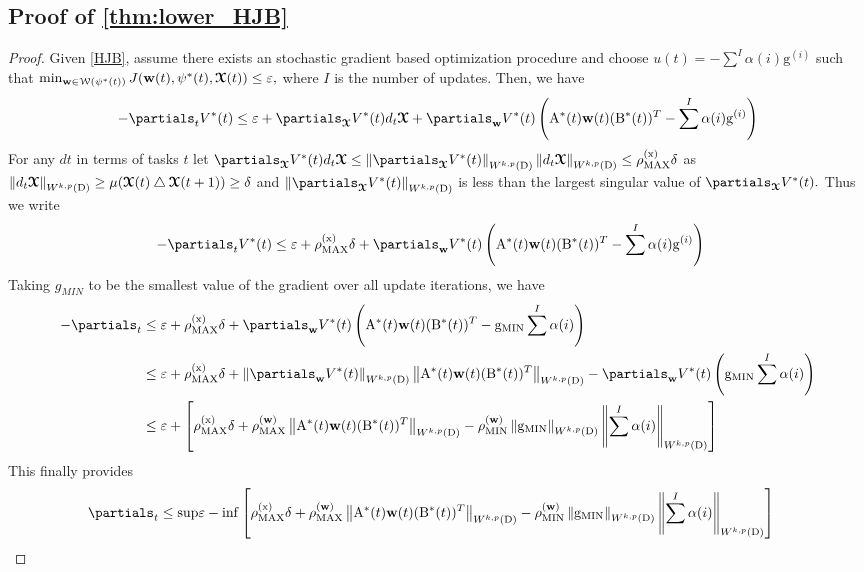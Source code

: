 \subsection{Proof of \cref{thm:lower_HJB}}\label{sec:lower_HJB}
\begin{proof}
Given \cref{HJB}, assume there exists an stochastic gradient based optimization procedure  and choose $ u(t) =- \sum^{I} \alpha(i) \mathrm{g}^{(i)}$  such that $\min_{\boldsymbol{\mathrm{w}} \in \mathcal{W}(\psi^*(t))} J(\boldsymbol{\mathrm{w}}(t),\psi^*(t),\boldsymbol{\mathcal{X}}(t)) \leq \varepsilon,$ where $I$ is the number of updates. Then, we have 
\begin{align*}
    -\partials_{t}V^*(t) & \leq \varepsilon + \partials_{\tx}V^*(t) d_{t} \tx +  \partials_{\weight}V^*(t)  \left( \mathrm{A}^*(t)\weight(t)( \mathrm{B}^*(t))^T - \sum^{I} \alpha(i) \mathrm{g}^{(i)}  \right)  \\    
\end{align*}
For any $dt$ in terms of tasks $t$  let $\partials_{\tx}V^*(t) d_{t} \tx \leq \norm{\partials_{\tx}V^*(t) } \norm{d_{t} \tx} \leq \sing \delta$ as $\left \|d_{t} \boldsymbol{\mathcal{X}} \right\|_{W^{k,p}(\mathrm{D})}  \geq \mu(\boldsymbol{\mathcal{X}}(t)\bigtriangleup \boldsymbol{\mathcal{X}}(t+1)) \geq \delta$ and $\norm{\partials_{\tx}V^*(t) }$ is less than the largest singular value of $\partials_{\tx}V^*(t) .$  Thus we write 
\begin{align*}
    -\partials_{t}V^*(t) & \leq \varepsilon + \sing \delta +  \partials_{\weight}V^*(t)  \left( \mathrm{A}^*(t)\weight(t)( \mathrm{B}^*(t))^T - \sum^{I} \alpha(i) \mathrm{g}^{(i)}  \right) 
\end{align*}
Taking $g_{MIN}$ to be the smallest value of the gradient over all update iterations, we have 
\begin{align*}
    -\partials_{t} & \leq \varepsilon + \sing \delta +  \partials_{\weight}V^*(t)  \left( \mathrm{A}^*(t)\weight(t) (\mathrm{B}^*(t))^T - \mathrm{g}_{\mathrm{MIN} } \sum^{I} \alpha(i)  \right) \\
     & \leq \varepsilon + \sing \delta +  \norm{\partials_{\weight}V^*(t) } \norm{\mathrm{A}^*(t)\weight(t)( \mathrm{B}^*(t))^T} - \partials_{\weight}V^*(t)  \left(  \mathrm{g}_{\mathrm{MIN} } \sum^{I} \alpha(i)  \right) \\
     & \leq \varepsilon + \left[\sing \delta +  \singw \norm{\mathrm{A}^*(t)\weight(t)( \mathrm{B}^*(t))^T} - \singmin \norm{\mathrm{g}_{\mathrm{MIN} }} \norm{\sum^{I} \alpha(i) } \right]
\end{align*}
This finally provides 
\begin{align*}
    \partials_{t} & \leq \mathrm{sup} \varepsilon - \mathrm{inf} \left[\sing \delta +  \singw \norm{\mathrm{A}^*(t)\weight(t)( \mathrm{B}^*(t))^T} - \singmin \norm{\mathrm{g}_{\mathrm{MIN} }} \norm{\sum^{I} \alpha(i) } \right]

\end{align*}
\end{proof}
